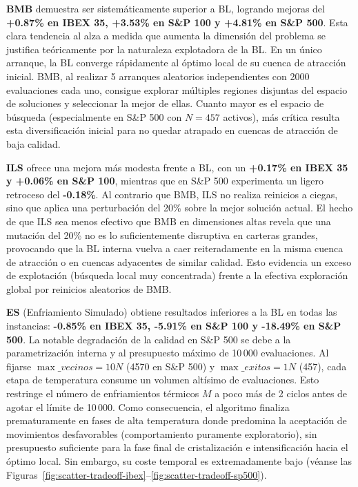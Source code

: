 \textbf{BMB} demuestra ser sistemáticamente superior a BL, logrando mejoras del \textbf{+0.87\% en IBEX 35, +3.53\% en S\&P 100 y +4.81\% en S\&P 500}. Esta clara tendencia al alza a medida que aumenta la dimensión del problema se justifica teóricamente por la naturaleza explotadora de la BL. En un único arranque, la BL converge rápidamente al óptimo local de su cuenca de atracción inicial. BMB, al realizar 5 arranques aleatorios independientes con 2000 evaluaciones cada uno, consigue explorar múltiples regiones disjuntas del espacio de soluciones y seleccionar la mejor de ellas. Cuanto mayor es el espacio de búsqueda (especialmente en S\&P 500 con $N=457$ activos), más crítica resulta esta diversificación inicial para no quedar atrapado en cuencas de atracción de baja calidad.

\textbf{ILS} ofrece una mejora más modesta frente a BL, con un \textbf{+0.17\% en IBEX 35 y +0.06\% en S\&P 100}, mientras que en S\&P 500 experimenta un ligero retroceso del \textbf{-0.18\%}. Al contrario que BMB, ILS no realiza reinicios a ciegas, sino que aplica una perturbación del 20\% sobre la mejor solución actual. El hecho de que ILS sea menos efectivo que BMB en dimensiones altas revela que una mutación del 20\% no es lo suficientemente disruptiva en carteras grandes, provocando que la BL interna vuelva a caer reiteradamente en la misma cuenca de atracción o en cuencas adyacentes de similar calidad. Esto evidencia un exceso de explotación (búsqueda local muy concentrada) frente a la efectiva exploración global por reinicios aleatorios de BMB.

\textbf{ES} (Enfriamiento Simulado) obtiene resultados inferiores a la BL en todas las instancias: \textbf{-0.85\% en IBEX 35, -5.91\% en S\&P 100 y -18.49\% en S\&P 500}. La notable degradación de la calidad en S\&P 500 se debe a la parametrización interna y al presupuesto máximo de 10\,000 evaluaciones. Al fijarse $\max\_vecinos = 10N$ (4570 en S\&P 500) y $\max\_exitos = 1N$ (457), cada etapa de temperatura consume un volumen altísimo de evaluaciones. Esto restringe el número de enfriamientos térmicos $M$ a poco más de 2 ciclos antes de agotar el límite de 10\,000. Como consecuencia, el algoritmo finaliza prematuramente en fases de alta temperatura donde predomina la aceptación de movimientos desfavorables (comportamiento puramente exploratorio), sin presupuesto suficiente para la fase final de cristalización e intensificación hacia el óptimo local. Sin embargo, su coste temporal es extremadamente bajo (véanse las Figuras~\ref{fig:scatter-tradeoff-ibex}--\ref{fig:scatter-tradeoff-sp500}).

